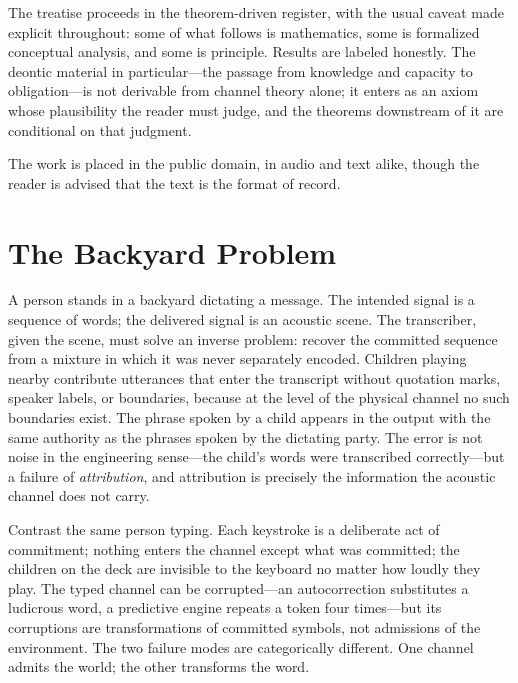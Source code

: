 \documentclass[11pt,oneside]{book}
\theoremstyle{plain}
\theoremstyle{definition}
\theoremstyle{remark}
\begin{document}
The treatise proceeds in the theorem-driven register, with the usual caveat made explicit throughout: some of what follows is mathematics, some is formalized conceptual analysis, and some is principle. Results are labeled honestly. The deontic material in particular---the passage from knowledge and capacity to obligation---is not derivable from channel theory alone; it enters as an axiom whose plausibility the reader must judge, and the theorems downstream of it are conditional on that judgment.

The work is placed in the public domain, in audio and text alike, though the reader is advised that the text is the format of record.

\tableofcontents

\mainmatter

\chapter{The Backyard Problem}

A person stands in a backyard dictating a message. The intended signal is a sequence of words; the delivered signal is an acoustic scene. The transcriber, given the scene, must solve an inverse problem: recover the committed sequence from a mixture in which it was never separately encoded. Children playing nearby contribute utterances that enter the transcript without quotation marks, speaker labels, or boundaries, because at the level of the physical channel no such boundaries exist. The phrase spoken by a child appears in the output with the same authority as the phrases spoken by the dictating party. The error is not noise in the engineering sense---the child's words were transcribed correctly---but a failure of \emph{attribution}, and attribution is precisely the information the acoustic channel does not carry.

Contrast the same person typing. Each keystroke is a deliberate act of commitment; nothing enters the channel except what was committed; the children on the deck are invisible to the keyboard no matter how loudly they play. The typed channel can be corrupted---an autocorrection substitutes a ludicrous word, a predictive engine repeats a token four times---but its corruptions are transformations of committed symbols, not admissions of the environment. The two failure modes are categorically different. One channel admits the world; the other transforms the word.
\end{document}
